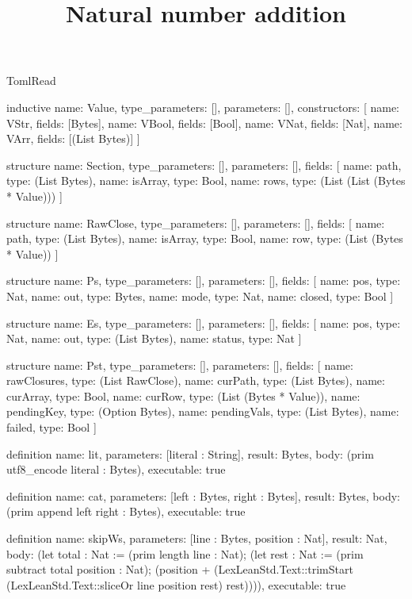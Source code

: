\begin{lexlean}{TomlRead}
\title{Natural number addition}
\begin{semanticmodule}
inductive{
  name: Value,
  type_parameters: [],
  parameters: [],
  constructors: [
    {name: VStr, fields: [Bytes]},
    {name: VBool, fields: [Bool]},
    {name: VNat, fields: [Nat]},
    {name: VArr, fields: [(List Bytes)]}
  ]
}

structure{
  name: Section,
  type_parameters: [],
  parameters: [],
  fields: [
    {name: path, type: (List Bytes)},
    {name: isArray, type: Bool},
    {name: rows, type: (List (List (Bytes * Value)))}
  ]
}

structure{
  name: RawClose,
  type_parameters: [],
  parameters: [],
  fields: [
    {name: path, type: (List Bytes)},
    {name: isArray, type: Bool},
    {name: row, type: (List (Bytes * Value))}
  ]
}

structure{
  name: Ps,
  type_parameters: [],
  parameters: [],
  fields: [
    {name: pos, type: Nat},
    {name: out, type: Bytes},
    {name: mode, type: Nat},
    {name: closed, type: Bool}
  ]
}

structure{
  name: Es,
  type_parameters: [],
  parameters: [],
  fields: [
    {name: pos, type: Nat},
    {name: out, type: (List Bytes)},
    {name: status, type: Nat}
  ]
}

structure{
  name: Pst,
  type_parameters: [],
  parameters: [],
  fields: [
    {name: rawClosures, type: (List RawClose)},
    {name: curPath, type: (List Bytes)},
    {name: curArray, type: Bool},
    {name: curRow, type: (List (Bytes * Value))},
    {name: pendingKey, type: (Option Bytes)},
    {name: pendingVals, type: (List Bytes)},
    {name: failed, type: Bool}
  ]
}

definition{
  name: lit,
  parameters: [literal : String],
  result: Bytes,
  body: (prim utf8_encode literal : Bytes),
  executable: true
}

definition{
  name: cat,
  parameters: [left : Bytes, right : Bytes],
  result: Bytes,
  body: (prim append left right : Bytes),
  executable: true
}

definition{
  name: skipWs,
  parameters: [line : Bytes, position : Nat],
  result: Nat,
  body: (let total : Nat := (prim length line : Nat); (let rest : Nat := (prim subtract total position : Nat); (position + (LexLeanStd.Text::trimStart (LexLeanStd.Text::sliceOr line position rest) rest)))),
  executable: true
}


\end{semanticmodule}
\end{lexlean}
